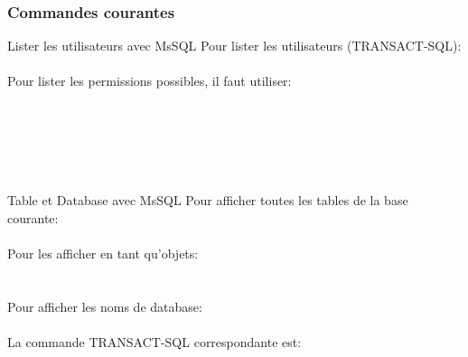 \documentclass[twoside,a4paper,12pt,titlepage]{book}
\begin{document}
\subsubsection{Commandes courantes}
\begin{FlagConsole}{Lister les utilisateurs avec MsSQL}
	Pour lister les utilisateurs (TRANSACT-SQL):\\
	\\
	\tcblower
	Pour lister les permissions possibles, il faut utiliser: \\
	\\
		\\
		\\
		\\
		\\
\end{FlagConsole}
\begin{FlagConsole}{Table et Database avec MsSQL}
	Pour afficher toutes les tables de la base courante:\\
	\\
	Pour les afficher en tant qu'objets:\\
	\\
	\\
	Pour afficher les noms de database:\\
	\\
	La commande TRANSACT-SQL correspondante est:\\
\end{FlagConsole}
\end{document}
